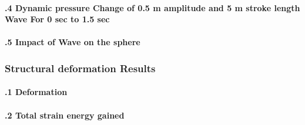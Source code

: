 
\paragraph{\fontsize{10}{12}.4 Dynamic pressure Change of 0.5 m amplitude and 5 m stroke length Wave For 0 sec to 1.5 sec}


\paragraph{\fontsize{10}{12}.5 Impact of Wave on the sphere}


\subsubsection*{\fontsize{10}{12} Structural deformation Results}

\paragraph{\fontsize{10}{12}.1 Deformation}


\paragraph{\fontsize{10}{12}.2 Total strain energy gained}

\clearpage